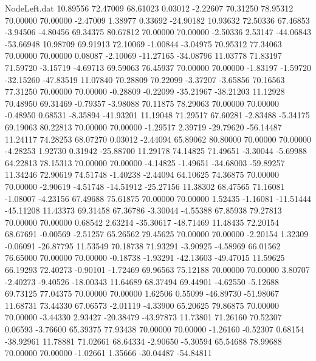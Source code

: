 \begin{filecontents}{NodeLeft.dat}
  10.89556   72.47009   68.61023     0.03012   -2.22607   70.31250   78.95312   70.00000   70.00000   -2.47009    1.38977    0.33692  -24.90182
  10.93632   72.50336   67.46853    -3.94506   -4.80456   69.34375   80.67812   70.00000   70.00000   -2.50336    2.53147  -44.06843  -53.66948
  10.98709   69.91913   72.10069    -1.00844   -3.04975   70.95312   77.34063   70.00000   70.00000    0.08087   -2.10069  -11.27165  -34.08796
  11.03778   71.83197   71.59720    -3.15719   -4.69713   69.59063   76.45937   70.00000   70.00000   -1.83197   -1.59720  -32.15260  -47.83519
  11.07840   70.28809   70.22099    -3.37207   -3.65856   70.16563   77.31250   70.00000   70.00000   -0.28809   -0.22099  -35.21967  -38.21203
  11.12928   70.48950   69.31469    -0.79357   -3.98088   70.11875   78.29063   70.00000   70.00000   -0.48950    0.68531   -8.35894  -41.93201
  11.19048   71.29517   67.60281    -2.83488   -5.34175   69.19063   80.22813   70.00000   70.00000   -1.29517    2.39719  -29.79620  -56.14487
  11.24117   74.28253   68.07270     0.03012   -2.44094   65.89062   80.80000   70.00000   70.00000   -4.28253    1.92730    0.31942  -25.88700
  11.29178   74.14825   71.49651    -3.30044   -5.69988   64.22813   78.15313   70.00000   70.00000   -4.14825   -1.49651  -34.68003  -59.89257
  11.34246   72.90619   74.51748    -1.40238   -2.44094   64.10625   74.36875   70.00000   70.00000   -2.90619   -4.51748  -14.51912  -25.27156
  11.38302   68.47565   71.16081    -1.08007   -4.23156   67.49688   75.61875   70.00000   70.00000    1.52435   -1.16081  -11.51444  -45.11208
  11.43373   69.31458   67.36786    -3.30044   -4.55388   67.85938   79.27813   70.00000   70.00000    0.68542    2.63214  -35.30617  -48.71469
  11.48435   72.20154   68.67691    -0.00569   -2.51257   65.26562   79.45625   70.00000   70.00000   -2.20154    1.32309   -0.06091  -26.87795
  11.53549   70.18738   71.93291    -3.90925   -4.58969   66.01562   76.65000   70.00000   70.00000   -0.18738   -1.93291  -42.13603  -49.47015
  11.59625   66.19293   72.40273    -0.90101   -1.72469   69.96563   75.12188   70.00000   70.00000    3.80707   -2.40273   -9.40526  -18.00343
  11.64689   68.37494   69.44901    -4.62550   -5.12688   69.73125   77.04375   70.00000   70.00000    1.62506    0.55099  -46.89730  -51.98067
  11.68731   73.44330   67.06573    -2.01119   -4.33900   65.20625   79.86875   70.00000   70.00000   -3.44330    2.93427  -20.38479  -43.97873
  11.73801   71.26160   70.52307     0.06593   -3.76600   65.39375   77.93438   70.00000   70.00000   -1.26160   -0.52307    0.68154  -38.92961
  11.78881   71.02661   68.64334    -2.90650   -5.30594   65.54688   78.99688   70.00000   70.00000   -1.02661    1.35666  -30.04487  -54.84811

\end{filecontents}
